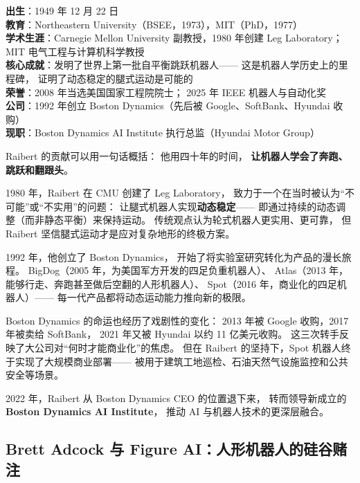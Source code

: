 \begin{corebox}
\textbf{出生}：1949 年 12 月 22 日\\
\textbf{教育}：Northeastern University（BSEE，1973），MIT（PhD，1977）\\
\textbf{学术生涯}：Carnegie Mellon University 副教授，1980 年创建 Leg Laboratory；
MIT 电气工程与计算机科学教授\\
\textbf{核心成就}：发明了世界上第一批自平衡跳跃机器人——
这是机器人学历史上的里程碑，
证明了动态稳定的腿式运动是可能的\\
\textbf{荣誉}：2008 年当选美国国家工程院院士；
2025 年 IEEE 机器人与自动化奖\\
\textbf{公司}：1992 年创立 Boston Dynamics（先后被 Google、SoftBank、Hyundai 收购）\\
\textbf{现职}：Boston Dynamics AI Institute 执行总监（Hyundai Motor Group）
\end{corebox}

Raibert 的贡献可以用一句话概括：
他用四十年的时间，
\textbf{让机器人学会了奔跑、跳跃和翻跟头}。

1980 年，Raibert 在 CMU 创建了 Leg Laboratory，
致力于一个在当时被认为``不可能''或``不实用''的问题：
让腿式机器人实现\textbf{动态稳定}——
即通过持续的动态调整（而非静态平衡）来保持运动。
传统观点认为轮式机器人更实用、更可靠，
但 Raibert 坚信腿式运动才是应对复杂地形的终极方案。

1992 年，他创立了 Boston Dynamics，
开始了将实验室研究转化为产品的漫长旅程。
BigDog（2005 年，为美国军方开发的四足负重机器人）、
Atlas（2013 年，能够行走、奔跑甚至做后空翻的人形机器人）、
Spot（2016 年，商业化的四足机器人）——
每一代产品都将动态运动能力推向新的极限。

Boston Dynamics 的命运也经历了戏剧性的变化：
2013 年被 Google 收购，2017 年被卖给 SoftBank，
2021 年又被 Hyundai 以约 11 亿美元收购。
这三次转手反映了大公司对``何时才能商业化''的焦虑。
但在 Raibert 的坚持下，Spot 机器人终于实现了大规模商业部署——
被用于建筑工地巡检、石油天然气设施监控和公共安全等场景。

2022 年，Raibert 从 Boston Dynamics CEO 的位置退下来，
转而领导新成立的 \textbf{Boston Dynamics AI Institute}，
推动 AI 与机器人技术的更深层融合。


\subsection{Brett Adcock 与 Figure AI：人形机器人的硅谷赌注}
\label{subsec:brett-adcock}

